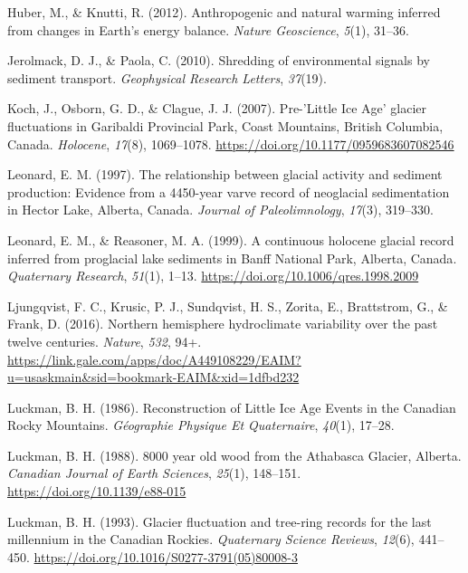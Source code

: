 \documentclass[
  letterpaper,
  DIV=11,
  numbers=noendperiod]{scrartcl}
\newlength{\cslhangindent}
\newlength{\cslentryspacingunit} %
\newenvironment{CSLReferences}[2] %
 {%
  \setlength{\parindent}{0pt}
  \ifodd #1
  \let\oldpar\par
  \def\par{\hangindent=\cslhangindent\oldpar}
  \fi
  \setlength{\parskip}{#2\cslentryspacingunit}
 }%
 {}
\begin{document}
\begin{CSLReferences}{1}{0}
\leavevmode{}%
Huber, M., \& Knutti, R. (2012). {Anthropogenic and natural warming
inferred from changes in Earth's energy balance}. \emph{Nature
Geoscience}, \emph{5}(1), 31--36.

\leavevmode{}%
Jerolmack, D. J., \& Paola, C. (2010). {Shredding of environmental
signals by sediment transport}. \emph{Geophysical Research Letters},
\emph{37}(19).

\leavevmode{}%
Koch, J., Osborn, G. D., \& Clague, J. J. (2007). {Pre-'Little Ice Age'
glacier fluctuations in Garibaldi Provincial Park, Coast Mountains,
British Columbia, Canada}. \emph{Holocene}, \emph{17}(8), 1069--1078.
\url{https://doi.org/10.1177/0959683607082546}

\leavevmode{}%
Leonard, E. M. (1997). {The relationship between glacial activity and
sediment production: Evidence from a 4450-year varve record of
neoglacial sedimentation in Hector Lake, Alberta, Canada}. \emph{Journal
of Paleolimnology}, \emph{17}(3), 319--330.

\leavevmode{}%
Leonard, E. M., \& Reasoner, M. A. (1999). {A continuous holocene
glacial record inferred from proglacial lake sediments in Banff National
Park, Alberta, Canada}. \emph{Quaternary Research}, \emph{51}(1), 1--13.
\url{https://doi.org/10.1006/qres.1998.2009}

\leavevmode{}%
Ljungqvist, F. C., Krusic, P. J., Sundqvist, H. S., Zorita, E.,
Brattstrom, G., \& Frank, D. (2016). {Northern hemisphere hydroclimate
variability over the past twelve centuries}. \emph{Nature}, \emph{532},
94+.
\url{https://link.gale.com/apps/doc/A449108229/EAIM?u=usaskmain\&sid=bookmark-EAIM\&xid=1dfbd232}

\leavevmode{}%
Luckman, B. H. (1986). {Reconstruction of Little Ice Age Events in the
Canadian Rocky Mountains}. \emph{G{é}ographie Physique Et Quaternaire},
\emph{40}(1), 17--28.

\leavevmode{}%
Luckman, B. H. (1988). {8000 year old wood from the Athabasca Glacier,
Alberta}. \emph{Canadian Journal of Earth Sciences}, \emph{25}(1),
148--151. \url{https://doi.org/10.1139/e88-015}

\leavevmode{}%
Luckman, B. H. (1993). {Glacier fluctuation and tree-ring records for
the last millennium in the Canadian Rockies}. \emph{Quaternary Science
Reviews}, \emph{12}(6), 441--450.
\url{https://doi.org/10.1016/S0277-3791(05)80008-3}


\end{CSLReferences}
\end{document}
